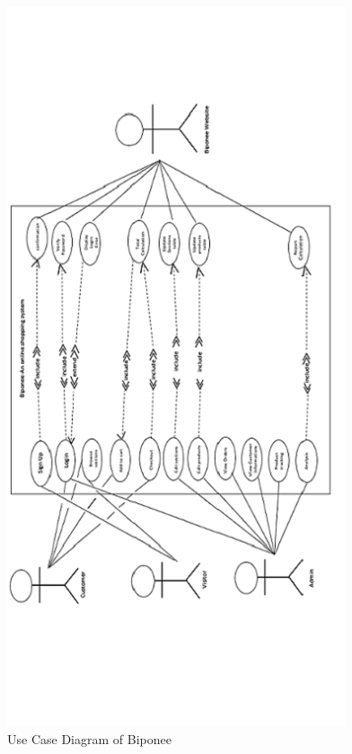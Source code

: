  \begin{figure}
\centering

\includegraphics{figures/usecasenewv.png}

\caption{Use Case Diagram of Biponee}
\end{figure}


\newpage
